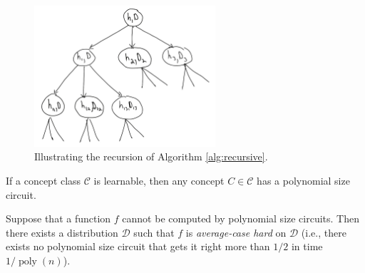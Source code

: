 \documentclass[letterpaper, reqno,11pt]{article}
\DeclareMathOperator{\poly}{poly}
\begin{document}
\begin{figure}[h]
  \centering
  \includegraphics[width=0.6\textwidth]{figures/recursion.png}
  \caption{Illustrating the recursion of Algorithm \ref{alg:recursive}.}
  \label{fig:recursion}
\end{figure}

\begin{corollary}
  If a concept class $\mathcal C$ is learnable, then any concept $C \in \mathcal C$ has a polynomial size circuit.
\end{corollary}

\begin{theorem}
  Suppose that a function $f$ cannot be computed by polynomial size circuits. Then there exists a distribution $\mathcal D$ such that $f$ is \emph{average-case hard} on $\mathcal D$ (i.e., there exists no polynomial size circuit that gets it right more than $1/2$ in time $1/\poly(n)$).
\end{theorem}
\end{document}
